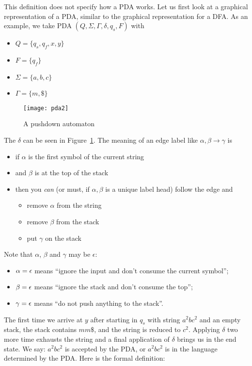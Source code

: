 This definition does not specify how a PDA works. Let us first look at
a graphical representation of a PDA, similar to the graphical
representation for a DFA. As an example, we take PDA
$(Q,\Sigma,\Gamma,\delta,q_s,F)$ with

\begin{itemize}
\item $Q = \{q_s, q_f, x, y\}$
\item $F = \{q_f\}$
\item $\Sigma = \{a,b,c\}$
\item $\Gamma = \{m, \$\}$
\end{itemize}

\begin{figure}[h]
	\centering
	\texttt{[image: pda2]}
	\caption{A pushdown automaton\label{pda2}}
\end{figure}

The $\delta$ can be seen in Figure~\ref{pda2}. The meaning of an edge label like $\alpha,\beta \rightarrow \gamma$ is
\begin{itemize}
	\item if $\alpha$ is the first symbol of the current string
	\item and $\beta$ is at the top of the stack
	\item then you \emph{can} (or must, if $\alpha,\beta$ is a unique label head) follow the edge and
	\begin{itemize}
		\item remove $\alpha$ from the string
		\item remove $\beta$ from the stack
		\item put $\gamma$ on the stack
	\end{itemize}
\end{itemize}

Note that $\alpha$, $\beta$ and $\gamma$ may be $\epsilon$:
\begin{itemize}
	\item $\alpha = \epsilon$ means ``ignore the input and don't consume the current symbol''; 
	\item $\beta = \epsilon$ means ``ignore the stack and don't consume the top'';
	\item $\gamma = \epsilon$ means ``do not push anything to the stack''.
\end{itemize}
The first time we arrive at $y$ after starting in $q_s$ with string
$a^2bc^2$ and an empty stack, the stack contains $mm\$$, and the string
is reduced to $c^2$. Applying $\delta$ two more time exhausts the
string and a final application of $\delta$ brings us in the end
state. We say: $a^2bc^2$ is accepted by the PDA, or $a^2bc^2$ is in
the language determined by the PDA. Here is the formal definition:


